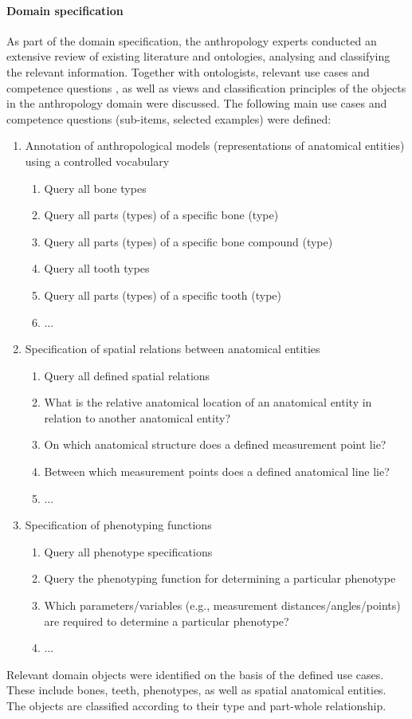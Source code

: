 \documentclass[sw]{iosart2x}
\begin{document}
\paragraph{Domain specification}
As part of the domain specification, the anthropology experts conducted an extensive review of existing literature and ontologies, analysing and classifying the relevant information.
Together with ontologists, relevant use cases and competence questions\footnotemark{} \citep{XD2016, MOMo2023}, as well as views and classification principles of the objects in the anthropology domain \citep{herre2010} were discussed.
%
The following main use cases and competence questions (sub-items, selected examples) were defined:
\begin{enumerate}
\item Annotation of anthropological models (representations of anatomical entities) using a controlled vocabulary
\begin{enumerate}
\item Query all bone types
\item Query all parts (types) of a specific bone (type)
\item Query all parts (types) of a specific bone compound (type)
\item Query all tooth types
\item Query all parts (types) of a specific tooth (type)
\item $\ldots$
\end{enumerate}
\item Specification of spatial relations between anatomical entities
\begin{enumerate}
\item Query all defined spatial relations
\item What is the relative anatomical location of an anatomical entity in relation to another anatomical entity?
\item On which anatomical structure does a defined measurement point lie?
\item Between which measurement points does a defined anatomical line lie?
\item $\ldots$
\end{enumerate}
\item Specification of phenotyping functions
\begin{enumerate}
\item Query all phenotype specifications
\item Query the phenotyping function for determining a particular phenotype
\item Which parameters/variables (e.g., measurement distances/angles/points) are required to determine a particular phenotype?
\item $\ldots$
\end{enumerate}
\end{enumerate}
Relevant domain objects were identified on the basis of the defined use cases.
These include bones, teeth, phenotypes, as well as spatial anatomical entities.
The objects are classified according to their type and part-whole relationship.
\end{document}
